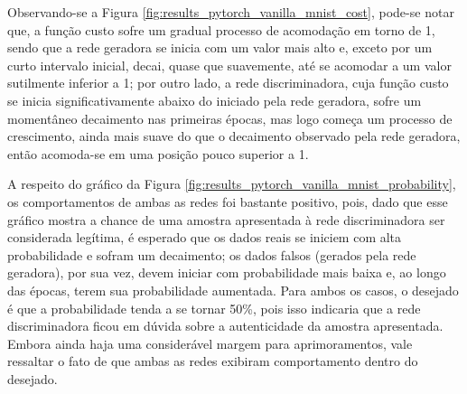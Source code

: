 Observando-se a Figura \ref{fig:results_pytorch_vanilla_mnist_cost}, pode-se notar que, a função custo sofre um gradual processo de acomodação em torno de 1, sendo que a rede geradora se inicia com um valor mais alto e, exceto por um curto intervalo inicial, decai, quase que suavemente,  até se acomodar a um valor sutilmente inferior a 1; por outro lado, a rede discriminadora, cuja função custo se inicia significativamente abaixo do iniciado pela rede geradora, sofre um momentâneo decaimento nas primeiras épocas, mas logo começa um processo de crescimento, ainda mais suave do que o decaimento observado pela rede geradora, então acomoda-se em uma posição pouco superior a 1. 

A respeito do gráfico da Figura \ref{fig:results_pytorch_vanilla_mnist_probability}, os comportamentos de ambas as redes foi bastante positivo, pois, dado que esse gráfico mostra a chance de uma amostra apresentada à rede discriminadora ser considerada legítima, é esperado que os dados reais se iniciem com alta probabilidade e sofram um decaimento; os dados falsos (gerados pela rede geradora), por sua vez, devem iniciar com probabilidade mais baixa e, ao longo das épocas, terem sua probabilidade aumentada. Para ambos os casos, o desejado é que a probabilidade tenda a se tornar 50\%, pois isso indicaria que a rede discriminadora ficou em dúvida sobre a autenticidade da amostra apresentada. Embora ainda haja uma considerável margem para aprimoramentos, vale ressaltar o fato de que ambas as redes exibiram comportamento dentro do desejado.